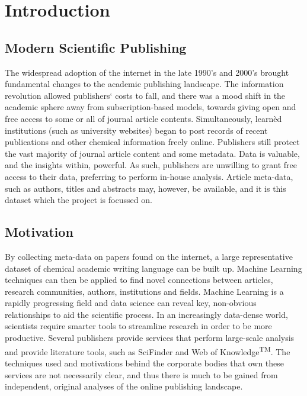 \chapter{Introduction}
\section{Modern Scientific Publishing}
The widespread adoption of the internet in the late 1990’s and 2000’s brought  fundamental changes to the academic publishing landscape. The information revolution allowed publishers` costs to fall, and there was a mood shift in the academic sphere away from subscription-based models, towards giving open and free access to some or all of journal article contents.
Simultaneously, learn\`{e}d institutions (such as university websites) began to post records of recent publications and other chemical information freely online. 
Publishers still protect the vast majority of journal article content and some metadata. Data is valuable, and the insights within, powerful. As such, publishers are unwilling to grant free access to their data, preferring to perform in-house analysis. Article meta-data, such as authors, titles and abstracts may, however, be available, and it is this dataset which the project is focussed on. 
\section{Motivation}
By collecting meta-data on papers found on the internet, a large representative dataset of chemical academic writing language can be built up. Machine Learning techniques can then be applied to find novel connections between articles, research communities, authors, institutions and fields. Machine Learning is a rapidly progressing field and data science can reveal key, non-obvious relationships to aid the scientific process. In an increasingly data-dense world, scientists require smarter tools to streamline research in order to be more productive. Several publishers provide services that perform large-scale analysis and provide literature tools, such as SciFinder\textsuperscript{\textregistered} and Web of Knowledge\textsuperscript{TM}. The techniques used and motivations behind the corporate bodies that own these services are not necessarily clear, and thus there is much to be gained from independent, original analyses of the online publishing landscape. 

